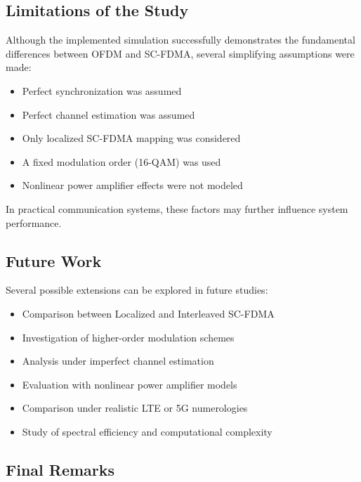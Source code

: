 \subsection{Limitations of the Study}

Although the implemented simulation successfully demonstrates the
fundamental differences between OFDM and SC-FDMA, several simplifying
assumptions were made:

\begin{itemize}
    \item Perfect synchronization was assumed
    \item Perfect channel estimation was assumed
    \item Only localized SC-FDMA mapping was considered
    \item A fixed modulation order (16-QAM) was used
    \item Nonlinear power amplifier effects were not modeled
\end{itemize}

In practical communication systems, these factors may further influence
system performance.

\subsection{Future Work}

Several possible extensions can be explored in future studies:

\begin{itemize}
    \item Comparison between Localized and Interleaved SC-FDMA
    \item Investigation of higher-order modulation schemes
    \item Analysis under imperfect channel estimation
    \item Evaluation with nonlinear power amplifier models
    \item Comparison under realistic LTE or 5G numerologies
    \item Study of spectral efficiency and computational complexity
\end{itemize}

\subsection{Final Remarks}


